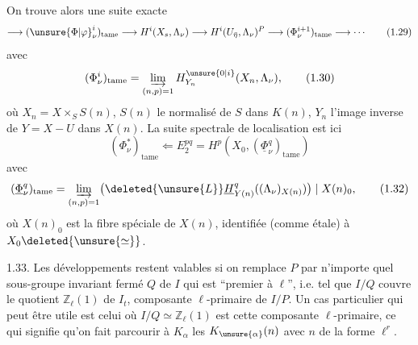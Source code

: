 
On trouve alors une suite exacte
\[
\longrightarrow({\unsure{\Phi|\varphi}}^i_\nu)_{\mathrm{tame}}\longrightarrow H^i(X_s,\Lambda_\nu)\longrightarrow H^i(U_{\bar\eta},\Lambda_\nu)^P\longrightarrow(\Phi^{i+1}_\nu)_{\mathrm{tame}}\longrightarrow\cdots
\tag*{(1.29)}
\]
avec
\[
(\Phi^i_\nu)_{\mathrm{tame}}=\varinjlim_{(n,p)=1}H^{\unsure{0|i}}_{Y_n}(X_n,\Lambda_\nu),
\tag*{(1.30)}
\]
où $X_n=X\times_S S(n)$, $S(n)$ le normalisé de $S$ dans $K(n)$, $Y_n$ l'image inverse de $Y=X-U$ dans $X(n)$. La suite spectrale de localisation est ici
\[
(\Phi^*_\nu)_{\mathrm{tame}}\Longleftarrow E_2^{pq}=H^p(X_0,(\underline\Phi^q_\nu)_{\mathrm{tame}})
\tag*{(1.31)}
\]
avec
\[
(\underline\Phi^q_\nu)_{\mathrm{tame}}=\varinjlim_{(n,p)=1}\bigl(\deleted{\unsure{L}}\underline H^q_{Y(n)}((\Lambda_\nu)_{X(n)})\bigr)\mid X(n)_0,
\tag*{(1.32)}
\]
où $X(n)_0$ est la  fibre spéciale de $X(n)$, identifiée (comme  étale) à $X_0\deleted{\unsure{\simeq}}$.


1.33. Les développements restent valables  si on remplace $P$ par n'importe quel sous-groupe invariant fermé $Q$ de $I$  qui est ``premier à $\ell$'', i.e. tel que $I/Q$ couvre le quotient $\mathbb Z_\ell(1)$ de $I_t$, composante $\ell$-primaire de $I/P$. Un cas particulier  qui peut être utile est celui où $I/Q\simeq\mathbb Z_\ell(1)$ est cette composante $\ell$-primaire, ce qui signifie qu'on fait parcourir à $K_\alpha$ les  $K_{\unsure{\alpha}}(n)$ avec $n$ de la forme $\ell^r$. 
